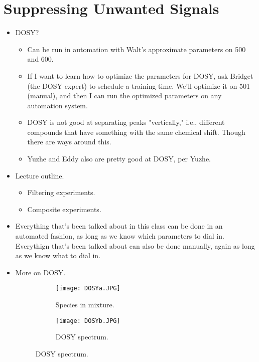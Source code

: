 \documentclass[../notes.tex]{subfiles}
\begin{document}
\section{Suppressing Unwanted Signals}
\begin{itemize}
    \item {}DOSY?
    \begin{itemize}
        \item Can be run in automation with Walt's approximate parameters on 500 and 600.
        \item If I want to learn how to optimize the parameters for DOSY, ask Bridget (the DOSY expert) to schedule a training time. We'll optimize it on 501 (manual), and then I can run the optimized parameters on any automation system.
        \item DOSY is not good at separating peaks "vertically," i.e., different compounds that have something with the same chemical shift. Though there are ways around this.
        \item Yuzhe and Eddy also are pretty good at DOSY, per Yuzhe.
    \end{itemize}
    \item Lecture outline.
    \begin{itemize}
        \item Filtering experiments.
        \item Composite experiments.
    \end{itemize}
    \item Everything that's been talked about in this class can be done in an automated fashion, as long as we know which parameters to dial in. Everythign that's been talked about can also be done manually, again as long as we know what to dial in.
    \item More on DOSY.
    \begin{figure}[h!]
        \centering
        \begin{subfigure}[b]{0.3\linewidth}
            \centering
            \texttt{[image: DOSYa.JPG]}
            \caption{Species in mixture.}
            \label{fig:DOSYa}
        \end{subfigure}
        \begin{subfigure}[b]{0.3\linewidth}
            \centering
            \texttt{[image: DOSYb.JPG]}
            \caption{DOSY spectrum.}
            \label{fig:DOSYb}
        \end{subfigure}

\end{figure}
\end{itemize}
\end{document}
